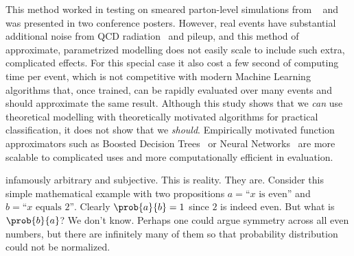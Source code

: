 This method worked in testing on smeared parton-level simulations from
\madgraph~\cite{Alwall:2014hca} and was presented in two conference posters.
However, real events have substantial additional noise from QCD
radiation~\cite{PhysRevD.83.074010} and pileup, and this method of approximate,
parametrized modelling does not easily scale to include such extra, complicated
effects.
For this special case it also cost a few second of computing time per event,
which is not competitive with modern Machine Learning algorithms that, once
trained, can be rapidly evaluated over many events and should approximate
the same result.
Although this study shows that we \emph{can} use theoretical modelling
with theoretically motivated algorithms for practical classification, it does
not show that we \emph{should}.
Empirically motivated function approximators such as
Boosted Decision Trees~\cite{xgboost} or
Neural Networks~\cite{MurphyKevinP.2012Mlap} are more scalable to complicated
uses and more computationally efficient in evaluation.


infamously arbitrary and subjective. This is reality. They are.
Consider this simple mathematical example with two propositions
$a=\textrm{``}x\textrm{ is even''}$ and
$b=\textrm{``}x\textrm{ equals }2\textrm{''}$.
Clearly $\prob{a}{b} = 1$ since $2$ is indeed even.
But what is $\prob{b}{a}$? We don't know. Perhaps one could argue symmetry
across all even numbers, but there are infinitely many of them so that
probability distribution could not be normalized.

\TODO{\ldots}
